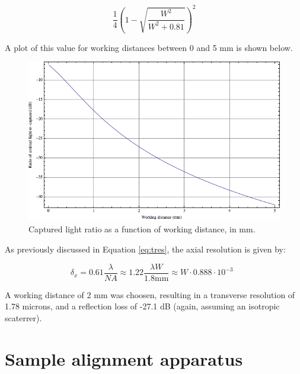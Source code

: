 \begin{equation}
\frac{1}{4} \left( 1 - \sqrt{\frac{W^2}{W^2 + 0.81}} \right) ^ 2
\end{equation}

A plot of this value for working distances between 0 and 5 mm is shown below.

\begin{figure}[h!]
\centering
\includegraphics[width=1.0\textwidth]{Images/System/grin_scattering.png}
\caption{Captured light ratio as a function of working distance, in mm.}
\end{figure}

As previously discussed in Equation \ref{eq:tres}, the axial resolution is given by:

\begin{equation} \label{eq:tres2}
\delta_x = 0.61 \frac{\lambda}{NA} \approx 1.22 \frac{\lambda W}{1.8 \mathrm{mm}} \approx W \cdot 0.888 \cdot 10^{-3} \;\;
\end{equation}

A working distance of 2 mm was choosen, resulting in a transverse resolution of 1.78 microns, and a reflection loss of -27.1 dB (again, assuming an isotropic scaterrer).

\section{Sample alignment apparatus}


